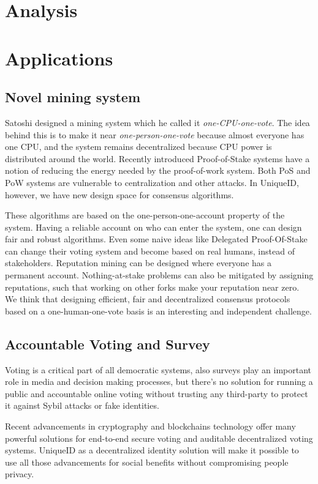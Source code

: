 \documentclass[conference]{IEEEtran}
\begin{document}
\section{Analysis}

 
\section{Applications}

\subsection{Novel mining system}
Satoshi designed a mining system which he called it \textit{one-CPU-one-vote}. The idea behind this is to make it near \textit{one-person-one-vote} because almost everyone has one CPU, and the system remains decentralized because CPU power is distributed around the world. Recently introduced Proof-of-Stake systems have a notion of reducing the energy needed by the proof-of-work system. Both PoS and PoW systems are vulnerable to centralization and other attacks. In UniqueID, however, we have new design space for consensus algorithms.


These algorithms are based on the one-person-one-account property of the system. Having a reliable account on who can enter the system, one can design fair and robust algorithms. Even some naive ideas like Delegated Proof-Of-Stake can change their voting system and become based on real humans, instead of stakeholders. Reputation mining can be designed where everyone has a permanent account. Nothing-at-stake problems can also be mitigated by assigning reputations, such that working on other forks make your reputation near zero. We think that designing efficient, fair and decentralized consensus protocols based on a one-human-one-vote basis is an interesting and independent challenge.

\subsection{Accountable Voting and Survey}
Voting is a critical part of all democratic systems, also surveys play an important role in media and decision making processes, but there's no solution for running a public and accountable online voting without trusting any third-party to protect it against Sybil attacks or fake identities.


Recent advancements in cryptography and blockchains technology offer many powerful solutions for end-to-end secure voting and auditable decentralized voting systems. UniqueID as a decentralized identity solution will make it possible to use all those advancements for social benefits without compromising people privacy.
\end{document}

